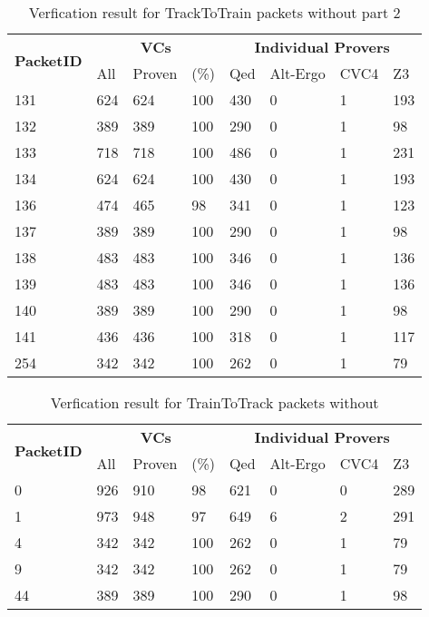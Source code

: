 \begin{table}[hbt]
\begin{center}
    \begin{tabular}{|m{10ex}|m{5ex}m{5ex}m{5ex}|m{5ex}m{5ex}m{5ex}m{5ex}|}
\hline
\multirow{2}{*}{\textbf{PacketID}} &
\multicolumn{3}{c|}{ \textbf{VCs}} &
\multicolumn{4}{c|}{\textbf{Individual Provers}}\\
\cline{2-8}
               &  All & Proven & (\%) & Qed & Alt-Ergo & CVC4 & Z3  \\
\hline
\hline
131 & 624 & 624 & 100 & 430 & 0 & 1 & 193\\
\hline
132 & 389 & 389 & 100 & 290 & 0 & 1 & 98\\
\hline
133 & 718 & 718 & 100 & 486 & 0 & 1 & 231\\
\hline
134 & 624 & 624 & 100 & 430 & 0 & 1 & 193\\
\hline
136 & 474 & 465 & 98 & 341 & 0 & 1 & 123\\
\hline
137 & 389 & 389 & 100 & 290 & 0 & 1 & 98\\
\hline
138 & 483 & 483 & 100 & 346 & 0 & 1 & 136\\
\hline
139 & 483 & 483 & 100 & 346 & 0 & 1 & 136\\
\hline
140 & 389 & 389 & 100 & 290 &  0 &  1 & 98\\
\hline
141 & 436 & 436 & 100 & 318 & 0 & 1 & 117\\
\hline
254 & 342 & 342 & 100 &262 & 0 & 1 & 79\\
\hline
\end{tabular}
\end{center}
\caption{\label{tbl:packets-without-niter-tracktotrain-part2} Verfication result for TrackToTrain packets without  part 2}
\end{table}

\FloatBarrier  %

\begin{table}[hbt]
\begin{center}
    \begin{tabular}{|m{10ex}|m{5ex}m{5ex}m{5ex}|m{5ex}m{5ex}m{5ex}m{5ex}|}
\hline
\multirow{2}{*}{\textbf{PacketID}} &
\multicolumn{3}{c|}{ \textbf{VCs}} &
\multicolumn{4}{c|}{\textbf{Individual Provers}}\\
\cline{2-8}
               &  All & Proven & (\%) & Qed & Alt-Ergo & CVC4 & Z3  \\
\hline
\hline
0 & 926 & 910 & 98 & 621 & 0 & 0 & 289\\
\hline
1 & 973 & 948 & 97 & 649 & 6 & 2 & 291\\
\hline
4 & 342 & 342 & 100 & 262 & 0 & 1 & 79\\
\hline
9 & 342 & 342 & 100 & 262 & 0 & 1 & 79\\
\hline
44 & 389 & 389 & 100 & 290 & 0 & 1 & 98\\
\hline
\end{tabular}
\end{center}
\caption{\label{tbl:packets-without-niter-traintotrack} Verfication result for TrainToTrack packets without }
\end{table}

